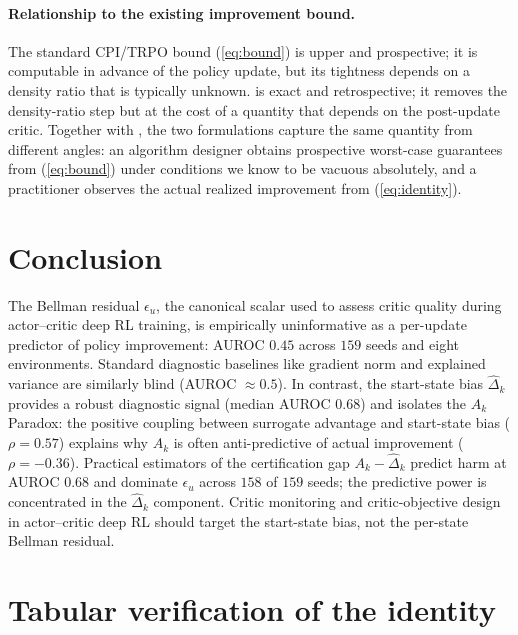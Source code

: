 \documentclass[11pt]{article}
\begin{document}
\paragraph{Relationship to the existing improvement bound.}
The standard CPI/TRPO bound (\ref{eq:bound}) is upper and prospective; it is computable in advance of the policy update, but its tightness depends on a density ratio that is typically unknown.  is exact and retrospective; it removes the density-ratio step but at the cost of a quantity that depends on the post-update critic. Together with , the two formulations capture the same quantity from different angles: an algorithm designer obtains prospective worst-case guarantees from (\ref{eq:bound}) under conditions we know to be vacuous absolutely, and a practitioner observes the actual realized improvement from (\ref{eq:identity}).

\section{Conclusion}
\label{sec:conclusion}

The Bellman residual $\epsilon_u$, the canonical scalar used to assess critic quality during actor--critic deep RL training, is empirically uninformative as a per-update predictor of policy improvement: AUROC $0.45$ across $159$ seeds and eight environments. Standard diagnostic baselines like gradient norm and explained variance are similarly blind (AUROC $\approx 0.5$). In contrast, the start-state bias $\hat\Delta_k$ provides a robust diagnostic signal (median AUROC 0.68) and isolates the $A_k$ Paradox: the positive coupling between surrogate advantage and start-state bias ($\rho = 0.57$) explains why $A_k$ is often anti-predictive of actual improvement ($\rho = -0.36$). Practical estimators of the certification gap $A_k - \hat\Delta_k$ predict harm at AUROC $0.68$ and dominate $\epsilon_u$ across $158$ of $159$ seeds; the predictive power is concentrated in the $\hat\Delta_k$ component. Critic monitoring and critic-objective design in actor--critic deep RL should target the start-state bias, not the per-state Bellman residual.

{\small


}

\appendix

\section{Tabular verification of the identity}
\label{app:tabular}
\end{document}
